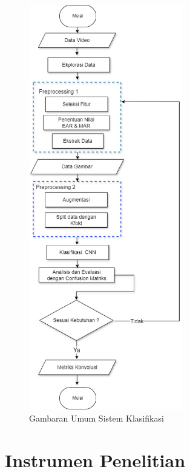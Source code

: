     \begin{figure}[H]
      \centering
      \includegraphics[width=0.6\textwidth]{figures/bab3/flowchart.png}
      \caption{Gambaran Umum Sistem Klasifikasi}
      \label{flowchart}
      \medskip %
      \begin{minipage}{0.8\textwidth}
        \centering

      \end{minipage}
    \end{figure}


    

\section{Instrumen Penelitian}

